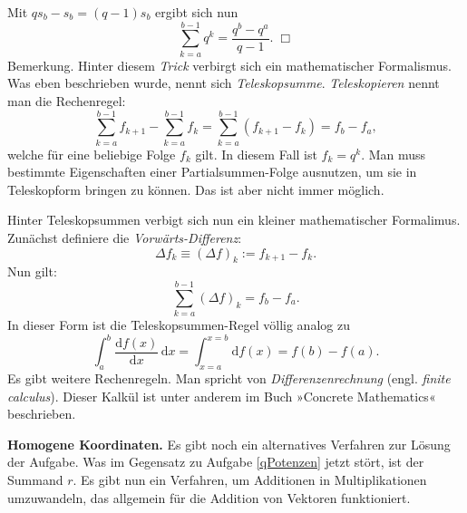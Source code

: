 \documentclass[a4paper,10pt,fleqn,twoside]{scrartcl}
\numberwithin{equation}{section}
\newcommand{\strong}[1]{{\normalfont\sffamily\bfseries #1}}
\theoremstyle{Aufgabe}
\begin{document}
Mit $qs_b-s_b=(q-1)s_b$ ergibt sich nun
\[\sum_{k=a}^{b-1} q^k = \frac{q^b-q^a}{q-1}.\;\Box\]
Bemerkung. Hinter diesem \emph{Trick} verbirgt sich ein mathematischer
Formalismus. Was eben beschrieben wurde, nennt sich
\emph{Teleskopsumme}. \emph{Teleskopieren} nennt man die Rechenregel:
\[\sum_{k=a}^{b-1} f_{k+1} - \sum_{k=a}^{b-1} f_k
= \sum_{k=a}^{b-1} (f_{k+1}-f_k) = f_b-f_a,\]
welche für eine beliebige Folge $f_k$ gilt. In diesem Fall ist
$f_k=q^k$. Man muss bestimmte Eigenschaften einer Partialsummen-Folge
ausnutzen, um sie in Teleskopform bringen zu können. Das ist aber nicht
immer möglich.

Hinter Teleskopsummen verbigt sich nun ein kleiner mathematischer
Formalimus. Zunächst definiere die \emph{Vorwärts-Differenz}:
\[\Delta f_k\equiv (\Delta f)_k := f_{k+1}-f_k.\]
Nun gilt:
\[\sum_{k=a}^{b-1} (\Delta f)_k = f_b-f_a.\]
In dieser Form ist die Teleskopsummen-Regel völlig analog zu
\[\int_a^b \frac{\mathrm df(x)}{\mathrm dx}\,\mathrm dx
= \int_{x=a}^{x=b} \mathrm df(x) = f(b)-f(a).\]
Es gibt weitere Rechenregeln. Man spricht von \emph{Differenzenrechnung}
(engl. \emph{finite calculus}). Dieser Kalkül ist unter anderem
im Buch »Concrete Mathematics« beschrieben.

\strong{Homogene Koordinaten.}
Es gibt noch ein alternatives Verfahren zur Lösung der Aufgabe.
Was im Gegensatz zu Aufgabe \ref{qPotenzen}
jetzt stört, ist der Summand $r$. Es gibt nun ein Verfahren, um
Additionen in Multiplikationen umzuwandeln, das allgemein für die
Addition von Vektoren funktioniert.
\end{document}
